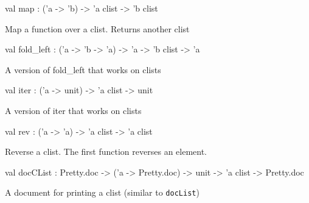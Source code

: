 \documentclass[11pt]{article}
\begin{document}
\label{val:Clist.map}\begin{ocamldoccode}
val map : ('a -> 'b) -> 'a clist -> 'b clist
\end{ocamldoccode}
\begin{ocamldocdescription}
Map a function over a clist. Returns another clist


\end{ocamldocdescription}




\label{val:Clist.fold-underscoreleft}\begin{ocamldoccode}
val fold_left : ('a -> 'b -> 'a) -> 'a -> 'b clist -> 'a
\end{ocamldoccode}
\begin{ocamldocdescription}
A version of fold\_left that works on clists


\end{ocamldocdescription}




\label{val:Clist.iter}\begin{ocamldoccode}
val iter : ('a -> unit) -> 'a clist -> unit
\end{ocamldoccode}
\begin{ocamldocdescription}
A version of iter that works on clists


\end{ocamldocdescription}




\label{val:Clist.rev}\begin{ocamldoccode}
val rev : ('a -> 'a) -> 'a clist -> 'a clist
\end{ocamldoccode}
\begin{ocamldocdescription}
Reverse a clist. The first function reverses an element.


\end{ocamldocdescription}




\label{val:Clist.docCList}\begin{ocamldoccode}
val docCList :
  Pretty.doc -> ('a -> Pretty.doc) -> unit -> 'a clist -> Pretty.doc
\end{ocamldoccode}
\begin{ocamldocdescription}
A document for printing a clist (similar to {\tt{docList}})


\end{ocamldocdescription}
\end{document}
